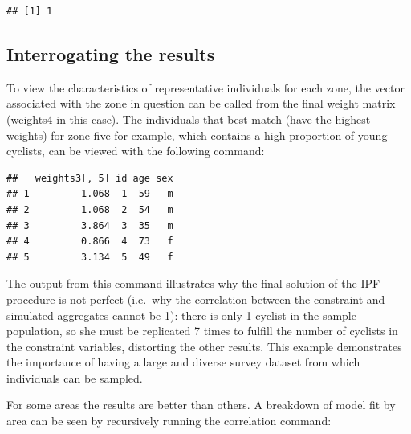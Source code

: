 \begin{Shaded}
\begin{Highlighting}[]
\NormalTok{(}\NormalTok{(}\NormalTok{(}
\end{Highlighting}
\end{Shaded}
\begin{verbatim}
## [1] 1
\end{verbatim}
\subsection{Interrogating the results}

To view the characteristics of representative individuals for each zone,
the vector associated with the zone in question can be called from the
final weight matrix (weights4 in this case). The individuals that best
match (have the highest weights) for zone five for example, which
contains a high proportion of young cyclists, can be viewed with the
following command:

\begin{Shaded}
\begin{Highlighting}[]
\NormalTok{(weights3[, }\NormalTok{], USd)}
\end{Highlighting}
\end{Shaded}
\begin{verbatim}
##   weights3[, 5] id age sex
## 1         1.068  1  59   m
## 2         1.068  2  54   m
## 3         3.864  3  35   m
## 4         0.866  4  73   f
## 5         3.134  5  49   f
\end{verbatim}
The output from this command illustrates why the final solution of the
IPF procedure is not perfect (i.e.~why the correlation between the
constraint and simulated aggregates cannot be 1): there is only 1
cyclist in the sample population, so she must be replicated 7 times to
fulfill the number of cyclists in the constraint variables, distorting
the other results. This example demonstrates the importance of having a
large and diverse survey dataset from which individuals can be sampled.

For some areas the results are better than others. A breakdown of model
fit by area can be seen by recursively running the correlation command:

